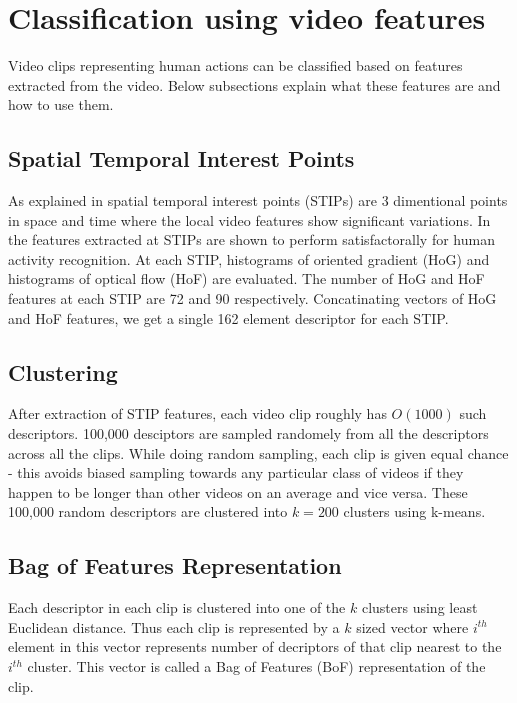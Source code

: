 \chapter{Classification using video features}


Video clips representing human actions can be classified based on features extracted from the video.
Below subsections explain what these features are and how to use them.

\section{Spatial Temporal Interest Points}
As explained in \cite{laptev2005} spatial temporal interest points (STIPs) are 3 dimentional points in 
space and time where the local video features show significant variations. 
In \cite{actionsInContext} the features extracted at STIPs are shown to perform satisfactorally for human activity recognition. 
At each STIP, histograms of oriented gradient (HoG) and  histograms of optical flow (HoF) are evaluated.
The number of HoG and HoF features at each STIP are 72 and 90 respectively.
Concatinating vectors of HoG and HoF features, we get a single 162 element descriptor for each STIP. 

\section{Clustering}
After extraction of STIP features, each video clip roughly has $O(1000)$ such descriptors.
100,000 desciptors are sampled randomely from all the descriptors across all the clips.
While doing random sampling, each clip is given equal chance - this avoids biased sampling
towards any particular class of videos if they happen to be longer than other videos on an average
and vice versa.
These 100,000 random descriptors are clustered into $k = 200$ clusters using k-means.

\section{Bag of Features Representation}
Each descriptor in each clip is clustered into one of the $k$ clusters using
least Euclidean distance. Thus each clip is represented by a $k$ sized vector
where $i^{th}$ element in this vector represents number of decriptors of that clip 
nearest to the $i^{th}$ cluster. This vector is called a Bag of Features (BoF)
representation of the clip.



